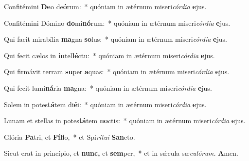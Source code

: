 \item Confitémini \textbf{De}o de\textbf{ó}rum:~* quóniam in ætérnum miseri\tinyhspace\textit{córdia} \textbf{e}jus.
\item Confitémini Dómino \textbf{do}mi\textbf{nó}rum:~* quóniam in ætérnum miseri\tinyhspace\textit{córdia} \textbf{e}jus.
\item Qui facit mirabília \textbf{ma}gna \textbf{so}lus:~* quóniam in ætérnum miseri\tinyhspace\textit{córdia} \textbf{e}jus.
\item Qui fecit cælos in \textbf{in}tel\textbf{lé}ctu:~* quóniam in ætérnum miseri\tinyhspace\textit{córdia} \textbf{e}jus.
\item Qui firmávit terram \textbf{su}per \textbf{a}quas:~* quóniam in ætérnum miseri\tinyhspace\textit{córdia} \textbf{e}jus.
\item Qui fecit lumi\textbf{ná}ria \textbf{ma}gna:~* quóniam in ætérnum miseri\tinyhspace\textit{córdia} \textbf{e}jus.
\item Solem in potes\textbf{tá}tem di\textbf{é}i:~* quóniam in ætérnum miseri\tinyhspace\textit{córdia} \textbf{e}jus.
\item Lunam et stellas in potes\textbf{tá}tem \textbf{no}ctis:~* quóniam in ætérnum miseri\tinyhspace\textit{córdia} \textbf{e}jus.
\item Glória \textbf{Pa}tri, et \textbf{Fí}\textbf{li}o,~* et Spi\tinyhspace\textit{rítui} \textbf{San}cto.
\item Sicut erat in princípio, et \textbf{nunc,} et \textbf{sem}per,~* et in sǽcula sæ\tinyhspace\textit{culórum.} \textbf{A}men.
